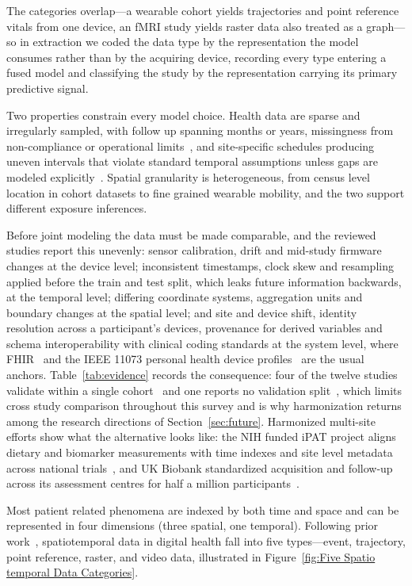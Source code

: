 \documentclass[journal]{IEEEtran}
\newif\ifsubmission
\begin{document}
The categories overlap---a wearable cohort yields trajectories and point reference vitals from one device, an fMRI study yields raster data also treated as a graph---so in extraction we coded the data type by the representation the model consumes rather than by the acquiring device, recording every type entering a fused model and classifying the study by the representation carrying its primary predictive signal.

Two properties constrain every model choice. Health data are sparse and irregularly sampled, with follow up spanning months or years, missingness from non-compliance or operational limits~\cite{che2018grud}, and site-specific schedules producing uneven intervals that violate standard temporal assumptions unless gaps are modeled explicitly~\cite{shukla2021irregular}. Spatial granularity is heterogeneous, from census level location in cohort datasets to fine grained wearable mobility, and the two support different exposure inferences.

Before joint modeling the data must be made comparable, and the reviewed studies report this unevenly: sensor calibration, drift and mid-study firmware changes at the device level; inconsistent timestamps, clock skew and resampling applied before the train and test split, which leaks future information backwards, at the temporal level; differing coordinate systems, aggregation units and boundary changes at the spatial level; and site and device shift, identity resolution across a participant's devices, provenance for derived variables and schema interoperability with clinical coding standards at the system level, where FHIR~\cite{ayaz2021fhir} and the IEEE 11073 personal health device profiles~\cite{ieee11073std} are the usual anchors. Table~\ref{tab:evidence} records the consequence: four of the twelve studies validate within a single cohort~\cite{2,9,Lim2025VirtualCGM,glaser2022deep} and one reports no validation split~\cite{XiaoLi2016DiabetesSpatiotemporal}, which limits cross study comparison throughout this survey and is why harmonization returns among the research directions of Section~\ref{sec:future}. Harmonized multi-site efforts show what the alternative looks like: the NIH funded iPAT project aligns dietary and biomarker measurements with time indexes and site level metadata across national trials~\cite{Fang2021iPAT}, and UK Biobank standardized acquisition and follow-up across its assessment centres for half a million participants~\cite{sudlow2015ukbiobank}.
\else

Most patient related phenomena are indexed by both time and space and can be represented in four dimensions (three spatial, one temporal). Following prior work~\cite{wang2022deep,atluri2018stdm}, spatiotemporal data in digital health fall into five types---event, trajectory, point reference, raster, and video data\ifsubmission\else , illustrated in Figure~\ref{fig:Five Spatio temporal Data Categories}\fi .
\end{document}

